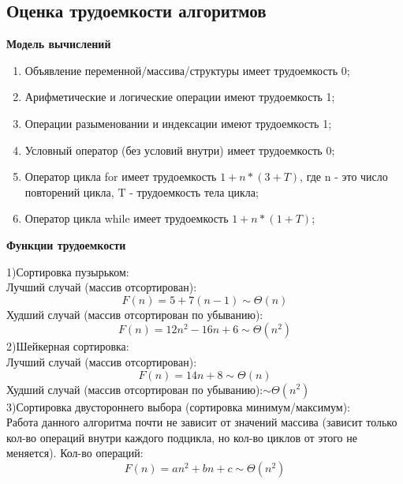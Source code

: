 \documentclass[a4paper,12pt]{article}
\begin{document}
\subsection{Оценка трудоемкости алгоритмов}
\begin{center}
\textbf{Модель вычислений}
\end{center}
\begin{enumerate}
\item Объявление переменной/массива/структуры имеет трудоемкость 0;
\item Арифметические и логические операции имеют трудоемкость 1;
\item Операции разыменовании и индексации имеют трудоемкость 1;
\item Условный оператор (без условий внутри) имеет трудоемкость 0;
\item Оператор цикла for имеет трудоемкость $1 + n * (3 + T)$, где n - это число повторений цикла, T - трудоемкость тела цикла;
\item Оператор цикла while имеет трудоемкость $1 + n * (1 + T)$;
\end{enumerate}
\begin{center}
\textbf{Функции трудоемкости}
\end{center}
1)Сортировка пузырьком:\\
Лучший случай (массив отсортирован):\\
\begin{equation}
F(n) = 5 + 7(n - 1) \sim \Theta(n)
\end{equation}
Худший случай (массив отсортирован по убыванию):\\
\begin{equation}
F(n) = 12n^2 - 16n + 6 \sim \Theta(n^2)
\end{equation}
2)Шейкерная сортировка:\\
Лучший случай (массив отсортирован):\\
\begin{equation}
F(n) = 14n + 8 \sim \Theta(n)
\end{equation}
Худший случай (массив отсортирован по убыванию):$\sim \Theta(n^2)$\\
3)Сортировка двустороннего выбора (сортировка минимум/максимум):\\
Работа данного алгоритма почти не зависит от значений массива (зависит только кол-во операций внутри каждого подцикла, но кол-во циклов от этого не меняется). Кол-во операций:\\
\begin{equation}
F(n) = an^2 + bn + c \sim \Theta(n^2)
\end{equation}
\end{document}

